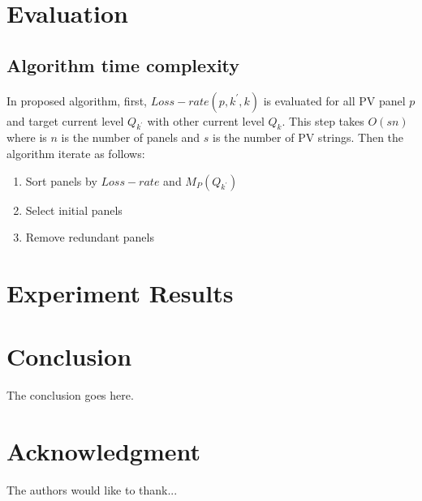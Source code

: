 \documentclass[journal]{IEEEtran}
\begin{document}
  
\section{Evaluation}\label{sec:evaluation}
\subsection{Algorithm time complexity}
In proposed algorithm, first, $Loss-rate(p,k^{'},k)$ is evaluated for all PV panel $p$ and target current level $Q_{k^{'}}$ with other current level $Q_{k}$.
This step takes $O(sn)$ where is $n$ is the number of panels and $s$ is the number of PV strings.
Then the algorithm iterate as follows:
\begin{enumerate}
\item\label{item:1} Sort panels by $Loss-rate$ and $M_{P}(Q_{k^{'}})$
\item\label{item:2} Select initial panels
\item\label{item:3} Remove redundant panels
\end{enumerate}


\section{Experiment Results}\label{sec:experiment-results}
\section{Conclusion}\label{sec:conclusion}
The conclusion goes here.



\appendices
\section*{Acknowledgment}


The authors would like to thank...






\end{document}
